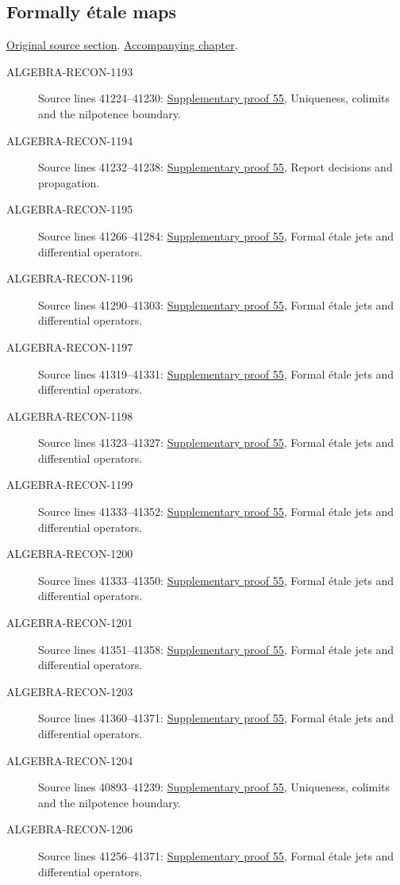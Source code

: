 \subsection{Formally \'etale maps}
\hypertarget{algebra-source-section-formally-etale}{}
\noindent\href{https://github.com/stacks/stacks-project/blob/a04446e57ec1fbc252a871afcec7752fb2807b14/algebra.tex\#L41164}{Original source section}. \href{algebra.pdf\#nameddest=section-formally-etale}{Accompanying chapter}.

\begin{description}
\item[ALGEBRA-RECON-1193] Source lines 41224--41230: \hyperlink{algebra_conormal_thickening_notes_20260928}{Supplementary proof 55}, Uniqueness, colimits and the nilpotence boundary.
\item[ALGEBRA-RECON-1194] Source lines 41232--41238: \hyperlink{algebra_conormal_thickening_notes_20260928}{Supplementary proof 55}, Report decisions and propagation.
\item[ALGEBRA-RECON-1195] Source lines 41266--41284: \hyperlink{algebra_conormal_thickening_notes_20260928}{Supplementary proof 55}, Formal étale jets and differential operators.
\item[ALGEBRA-RECON-1196] Source lines 41290--41303: \hyperlink{algebra_conormal_thickening_notes_20260928}{Supplementary proof 55}, Formal étale jets and differential operators.
\item[ALGEBRA-RECON-1197] Source lines 41319--41331: \hyperlink{algebra_conormal_thickening_notes_20260928}{Supplementary proof 55}, Formal étale jets and differential operators.
\item[ALGEBRA-RECON-1198] Source lines 41323--41327: \hyperlink{algebra_conormal_thickening_notes_20260928}{Supplementary proof 55}, Formal étale jets and differential operators.
\item[ALGEBRA-RECON-1199] Source lines 41333--41352: \hyperlink{algebra_conormal_thickening_notes_20260928}{Supplementary proof 55}, Formal étale jets and differential operators.
\item[ALGEBRA-RECON-1200] Source lines 41333--41350: \hyperlink{algebra_conormal_thickening_notes_20260928}{Supplementary proof 55}, Formal étale jets and differential operators.
\item[ALGEBRA-RECON-1201] Source lines 41351--41358: \hyperlink{algebra_conormal_thickening_notes_20260928}{Supplementary proof 55}, Formal étale jets and differential operators.
\item[ALGEBRA-RECON-1203] Source lines 41360--41371: \hyperlink{algebra_conormal_thickening_notes_20260928}{Supplementary proof 55}, Formal étale jets and differential operators.
\item[ALGEBRA-RECON-1204] Source lines 40893--41239: \hyperlink{algebra_conormal_thickening_notes_20260928}{Supplementary proof 55}, Uniqueness, colimits and the nilpotence boundary.
\item[ALGEBRA-RECON-1206] Source lines 41256--41371: \hyperlink{algebra_conormal_thickening_notes_20260928}{Supplementary proof 55}, Formal étale jets and differential operators.
\end{description}

